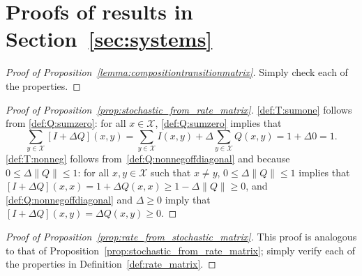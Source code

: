 \documentclass[10pt,a4paper]{paper}
\theoremstyle{definition}
\newcommand{\states}{\mathcal{X}}
\newcommand{\norm}[1]{\left\lVert #1 \right\rVert}
\begin{document}
\section{Proofs of results in Section~\ref{sec:systems}}\label{app:systems}

\begin{proof}[Proof of Proposition~\ref{lemma:compositiontransitionmatrix}]
Simply check each of the properties.
\end{proof}


\begin{proof}[Proof of Proposition~\ref{prop:stochastic_from_rate_matrix}]
\ref{def:T:sumone} follows from \ref{def:Q:sumzero}: for all $x\in\states$, \ref{def:Q:sumzero} implies that
\begin{equation*}
\sum_{y\in\states} [I + \Delta Q](x,y) = \sum_{y\in\states}I(x,y) + \Delta \sum_{y\in\states}Q(x,y) = 1+\Delta 0=1.
\end{equation*}
\ref{def:T:nonneg} follows from~\ref{def:Q:nonnegoffdiagonal} and because $0\leq \Delta\norm{Q} \leq 1$: for all $x,y\in\states$ such that $x\neq y$, $0\leq\Delta\norm{Q} \leq 1$ implies that $[I+\Delta Q](x,x)=1+\Delta Q(x,x)\geq 1-\Delta\norm{Q}\geq0$, and \ref{def:Q:nonnegoffdiagonal} and $\Delta\geq0$ imply that $[I+\Delta Q](x,y)=\Delta Q(x,y)\geq0$.
\end{proof}

\begin{proof}[Proof of Proposition~\ref{prop:rate_from_stochastic_matrix}]
This proof is analogous to that of Proposition~\ref{prop:stochastic_from_rate_matrix}; simply verify each of the properties in Definition~\ref{def:rate_matrix}.
\end{proof}
\end{document}
